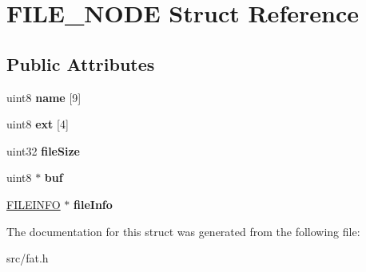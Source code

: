 \hypertarget{struct_f_i_l_e___n_o_d_e}{}\section{F\+I\+L\+E\+\_\+\+N\+O\+D\+E Struct Reference}
\label{struct_f_i_l_e___n_o_d_e}
\subsection*{Public Attributes}
\begin{DoxyCompactItemize}
\item 
\hypertarget{struct_f_i_l_e___n_o_d_e_a83752c9d5c768210eced2130137b315e}{}uint8 {\bfseries name} \mbox{[}9\mbox{]}\label{struct_f_i_l_e___n_o_d_e_a83752c9d5c768210eced2130137b315e}

\item 
\hypertarget{struct_f_i_l_e___n_o_d_e_a997962a8889ae327b0d45ab31cc4bb2a}{}uint8 {\bfseries ext} \mbox{[}4\mbox{]}\label{struct_f_i_l_e___n_o_d_e_a997962a8889ae327b0d45ab31cc4bb2a}

\item 
\hypertarget{struct_f_i_l_e___n_o_d_e_ad74bf122670ff240a90527187451f2cf}{}uint32 {\bfseries file\+Size}\label{struct_f_i_l_e___n_o_d_e_ad74bf122670ff240a90527187451f2cf}

\item 
\hypertarget{struct_f_i_l_e___n_o_d_e_aecec7d936b0ee681cfef0913dab5a837}{}uint8 $\ast$ {\bfseries buf}\label{struct_f_i_l_e___n_o_d_e_aecec7d936b0ee681cfef0913dab5a837}

\item 
\hypertarget{struct_f_i_l_e___n_o_d_e_a533b6f23a572b72c946049f988ca3aa3}{}\hyperlink{struct_f_i_l_e_i_n_f_o}{F\+I\+L\+E\+I\+N\+F\+O} $\ast$ {\bfseries file\+Info}\label{struct_f_i_l_e___n_o_d_e_a533b6f23a572b72c946049f988ca3aa3}

\end{DoxyCompactItemize}


The documentation for this struct was generated from the following file\+:\begin{DoxyCompactItemize}
\item 
src/fat.\+h\end{DoxyCompactItemize}

